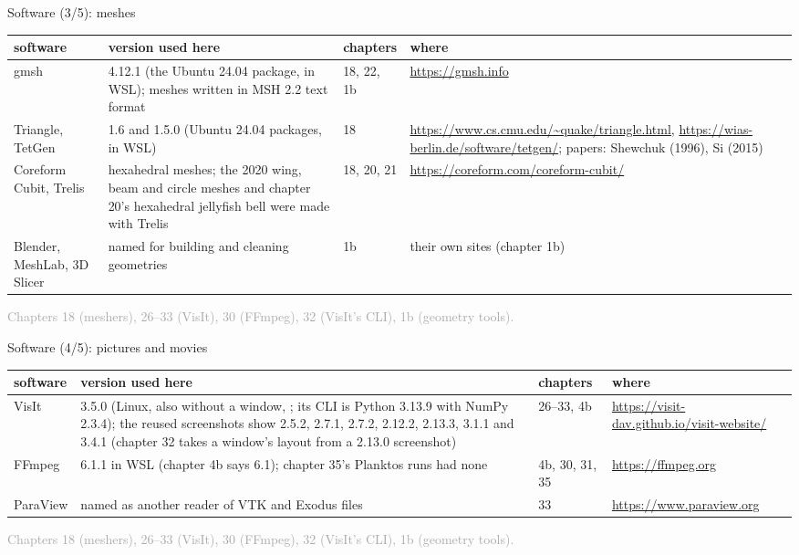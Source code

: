 \documentclass[aspectratio=169,11pt]{beamer}
\newcommand{\sourcecredit}[1]{\vfill\begin{flushright}\tiny\textcolor{DarkGray}{#1}\end{flushright}}
\begin{document}
\begin{frame}{Software (3/5): meshes}
\label{fr:sw2}
\scriptsize
\renewcommand{\arraystretch}{1.08}
\begin{tabular}{@{}L{0.14\textwidth}L{0.41\textwidth}L{0.11\textwidth}L{0.25\textwidth}@{}}
\toprule
software & version used here & chapters & where\\
\midrule
gmsh & 4.12.1 (the Ubuntu 24.04 package, in WSL); meshes written in MSH 2.2 text format & 18, 22, 1b & \url{https://gmsh.info}\\
Triangle, TetGen & 1.6 and 1.5.0 (Ubuntu 24.04 packages, in WSL) & 18 & \url{https://www.cs.cmu.edu/~quake/triangle.html}, \url{https://wias-berlin.de/software/tetgen/}; papers: Shewchuk (1996), Si (2015)\\
Coreform Cubit, Trelis & hexahedral meshes; the 2020 wing, beam and circle meshes and chapter 20's hexahedral jellyfish bell were made with Trelis & 18, 20, 21 & \url{https://coreform.com/coreform-cubit/}\\
Blender, MeshLab, 3D Slicer & named for building and cleaning geometries & 1b & their own sites (chapter 1b)\\
\bottomrule
\end{tabular}
\sourcecredit{Chapters 18 (meshers), 26--33 (VisIt), 30 (FFmpeg), 32 (VisIt's CLI), 1b (geometry tools).}
\end{frame}

\begin{frame}{Software (4/5): pictures and movies}
\label{fr:sw2b}
\scriptsize
\renewcommand{\arraystretch}{1.08}
\begin{tabular}{@{}L{0.14\textwidth}L{0.41\textwidth}L{0.11\textwidth}L{0.25\textwidth}@{}}
\toprule
software & version used here & chapters & where\\
\midrule
VisIt & 3.5.0 (Linux, also without a window, ; its CLI is Python 3.13.9 with NumPy 2.3.4); the reused screenshots show 2.5.2, 2.7.1, 2.7.2, 2.12.2, 2.13.3, 3.1.1 and 3.4.1 (chapter 32 takes a window's layout from a 2.13.0 screenshot) & 26--33, 4b & \url{https://visit-dav.github.io/visit-website/}\\
FFmpeg & 6.1.1 in WSL (chapter 4b says 6.1); chapter 35's Planktos runs had none & 4b, 30, 31, 35 & \url{https://ffmpeg.org}\\
ParaView & named as another reader of VTK and Exodus files & 33 & \url{https://www.paraview.org}\\
\bottomrule
\end{tabular}
\sourcecredit{Chapters 18 (meshers), 26--33 (VisIt), 30 (FFmpeg), 32 (VisIt's CLI), 1b (geometry tools).}
\end{frame}
\end{document}

